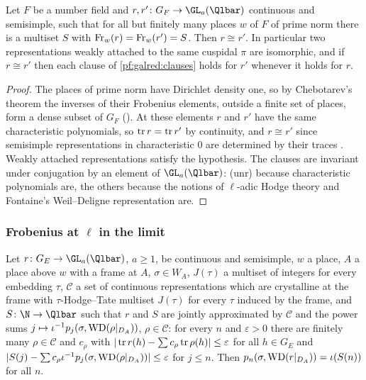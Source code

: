 \begin{lemma}\label{pf:galred:repiso}
Let $F$ be a number field and $r,r'\colon G_F\to\GL_a(\Qlbar)$ continuous and semisimple, such that for all but finitely
many places $w$ of $F$ of prime norm there is a multiset $S$ with $\operatorname{Fr}_w(r)=\operatorname{Fr}_w(r')=S$. Then $r\cong r'$. In
particular two representations weakly attached to the same cuspidal $\pi$ are isomorphic, and if $r\cong r'$ then each
clause of \cref{pf:galred:clauses} holds for $r'$ whenever it holds for $r$.
\end{lemma}

\begin{proof}
The places of prime norm have Dirichlet density one, so by Chebotarev's theorem the inverses of their Frobenius elements,
outside a finite set of places, form a dense subset of $G_F$ (). At
these elements $r$ and $r'$ have the same characteristic polynomials, so $\operatorname{tr} r=\operatorname{tr} r'$ by continuity, and $r\cong
r'$ since semisimple representations in characteristic $0$ are determined by their traces
\cite[\S30]{CurtisReiner1962}. Weakly attached representations
satisfy the hypothesis. The clauses are invariant under conjugation by an element of $\GL_a(\Qlbar)$: (unr) because
characteristic polynomials are, the others because the notions of $\ell$-adic Hodge theory and Fontaine's Weil--Deligne
representation are.
\end{proof}

\subsubsection{Frobenius at \texorpdfstring{$\ell$}{l} in the limit}

\begin{theorem}\label{pf:galred:closedphi}
Let $r\colon G_E\to\GL_a(\Qlbar)$, $a\ge1$, be continuous and semisimple, $w$ a place, $A$ a place above $w$ with a frame at
$A$, $\sigma\in W_A$, $J(\tau)$ a multiset of integers for every embedding $\tau$, $\mathcal C$ a set of continuous
representations which are crystalline at the frame with $\tau$-Hodge--Tate multiset $J(\tau)$ for every $\tau$ induced by the
frame, and $S\colon\N\to\Qlbar$ such that $r$ and $S$ are jointly approximated by $\mathcal C$ and the power sums
$j\mapsto\iota^{-1}p_j(\sigma,\mathrm{WD}(\rho|_{D_A}))$, $\rho\in\mathcal C$: for every $n$ and $\varepsilon>0$ there are
finitely many $\rho\in\mathcal C$ and $c_\rho$ with $|\operatorname{tr} r(h)-\sum c_\rho\operatorname{tr}\rho(h)|\le\varepsilon$ for all
$h\in G_E$ and $|S(j)-\sum c_\rho\iota^{-1}p_j(\sigma,\mathrm{WD}(\rho|_{D_A}))|\le\varepsilon$ for $j\le n$. Then
$p_n(\sigma,\mathrm{WD}(r|_{D_A}))=\iota(S(n))$ for all $n$.
\end{theorem}

